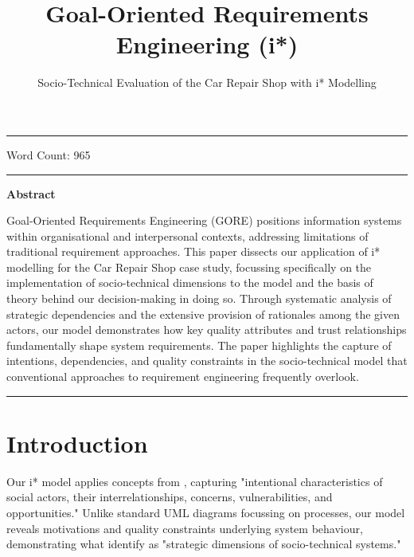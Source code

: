 \documentclass[14pt,a4paper]{article}
\title{Goal-Oriented Requirements Engineering (i*)}
\author{Socio-Technical Evaluation of the Car Repair Shop with i* Modelling}
\date{}
\begin{document}
\maketitle

\hrule

\vspace{3em}

Word Count: 965

\vspace{3em}
\hrule

\vspace{2em}
\textbf{\Large{Abstract}}
\vspace{1em}

Goal-Oriented Requirements Engineering (GORE) positions information systems within organisational and interpersonal contexts, addressing limitations of traditional requirement approaches. This paper dissects our application of i* modelling for the Car Repair Shop case study, focussing specifically on the implementation of socio-technical dimensions to the model and the basis of theory behind our decision-making in doing so. Through systematic analysis of strategic dependencies and the extensive provision of rationales among the given actors, our model demonstrates how key quality attributes and trust relationships fundamentally shape system requirements. The paper highlights the capture of intentions, dependencies, and quality constraints in the socio-technical model that conventional approaches to requirement engineering frequently overlook.

\vspace{3em}
\hrule

\thispagestyle{empty}

\tableofcontents
{}

\newpage


\section{Introduction}

Our i* model  applies concepts from \textcite[p. 127]{Yu2011}, capturing "intentional characteristics of social actors, their interrelationships, concerns, vulnerabilities, and opportunities." Unlike standard UML diagrams focussing on processes, our model reveals motivations and quality constraints underlying system behaviour, demonstrating what \textcite[p. 342]{Dalpiaz2016} identify as "strategic dimensions of socio-technical systems."
\end{document}
